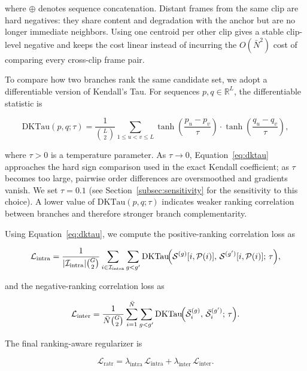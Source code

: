 \documentclass[symmetry,article,submit,pdftex,moreauthors]{Definitions/mdpi}
\begin{document}
where $\oplus$ denotes sequence concatenation. Distant frames from the same clip are hard negatives: they share content and degradation with the anchor but are no longer immediate neighbors. Using one centroid per other clip gives a stable clip-level negative and keeps the cost linear instead of incurring the $O(\bar{N}^2)$ cost of comparing every cross-clip frame pair.

To compare how two branches rank the same candidate set, we adopt a differentiable version of Kendall's Tau. For sequences $p,q\in\mathbb{R}^{L}$, the differentiable statistic is

\begin{equation}
\mathrm{DKTau}(p,q;\tau)
= \frac{1}{\binom{L}{2}}
\sum_{1\le u < v \le L}
\tanh\!\!\left(\frac{p_u-p_v}{\tau}\right)
\cdot
\tanh\!\!\left(\frac{q_u-q_v}{\tau}\right),
\label{eq:dktau}
\end{equation}

where $\tau>0$ is a temperature parameter. As $\tau\rightarrow 0$, Equation~\eqref{eq:dktau} approaches the hard sign comparison used in the exact Kendall coefficient; as $\tau$ becomes too large, pairwise order differences are oversmoothed and gradients vanish. We set $\tau=0.1$ (see Section~\ref{subsec:sensitivity} for the sensitivity to this choice). A lower value of $\mathrm{DKTau}(p,q;\tau)$ indicates weaker ranking correlation between branches and therefore stronger branch complementarity.

Using Equation~\eqref{eq:dktau}, we compute the positive-ranking correlation loss as

\begin{equation}
\mathcal{L}_{\text{intra}} =
\frac{1}{|\mathcal{I}_{\text{intra}}| \binom{G}{2}}
\sum_{i\in\mathcal{I}_{\text{intra}}}
\sum_{g < g'}
\mathrm{DKTau}\!\Bigl(
\mathcal{S}^{(g)}[i,\mathcal{P}(i)],\,
\mathcal{S}^{(g')}[i,\mathcal{P}(i)];\,\tau
\Bigr),
\label{eq:loss_intra}
\end{equation}

and the negative-ranking correlation loss as

\begin{equation}
\mathcal{L}_{\text{inter}} =
\frac{1}{\bar{N} \binom{G}{2}}
\sum_{i=1}^{\bar{N}}
\sum_{g < g'}
\mathrm{DKTau}\!\Bigl(
\bar{\mathcal{S}}_i^{(g)},\,
\bar{\mathcal{S}}_i^{(g')};\,
\tau
\Bigr).
\end{equation}

The final ranking-aware regularizer is

\begin{equation}
\mathcal{L}_{\text{ratr}} =
\lambda_{\text{intra}}\,\mathcal{L}_{\text{intra}}
+ \lambda_{\text{inter}}\,\mathcal{L}_{\text{inter}}.
\label{eq:loss_ratr}
\end{equation}
\end{document}
